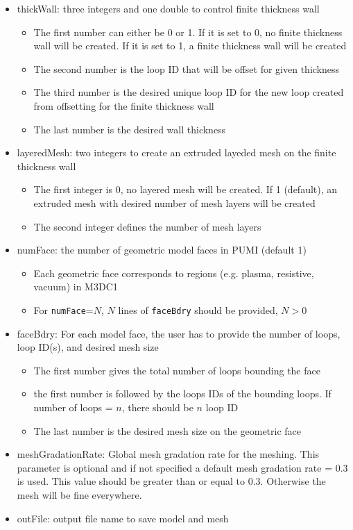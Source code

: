 \begin{itemize}
\item thickWall: three integers and one double to control finite thickness wall
  \begin{itemize}
  \item The first number can either be 0 or 1. If it is set to 0, no finite thickness wall will be created. If it is set to 1, a finite thickness wall will be created
  \item The second number is the loop ID that will be offset for given thickness
  \item The third number is the desired unique loop ID for the new loop created from offsetting for the finite thickness wall
  \item The last number is the desired wall thickness
  \end{itemize} 

\item layeredMesh: two integers to create an extruded layeded mesh on the finite thickness wall
  \begin{itemize}
  \item The first integer is 0, no layered mesh will be created. If 1 (default), an extruded mesh with desired number of mesh layers will be created
  \item The second integer defines the number of mesh layers
  \end{itemize}

\item numFace: the number of geometric model faces in PUMI (default 1)
    \begin{itemize}
  \item Each geometric face corresponds to regions (e.g. plasma, resistive, vacuum) in M3DC1
  \item For \texttt{numFace}=$N$, $N$ lines of \texttt{faceBdry} should be provided, $N > 0$
  \end{itemize}
\item faceBdry: For each model face, the user has to provide the number of loops, loop ID(s), and desired mesh size
  \begin{itemize}
  \item The first number gives the total number of loops bounding the face
  \item the first number is followed by the loops IDs of the bounding loops. If number of loops = $n$, there should be $n$ loop ID
  \item The last number is the desired mesh size on the geometric face
    \end{itemize}

\item meshGradationRate: Global mesh gradation rate for the meshing. This parameter is optional and if not specified a default mesh gradation rate = 0.3 is used. This value should be greater than or equal to 0.3. Otherwise the mesh will be fine everywhere.
\item outFile: output file name to save model and mesh
\end{itemize}

